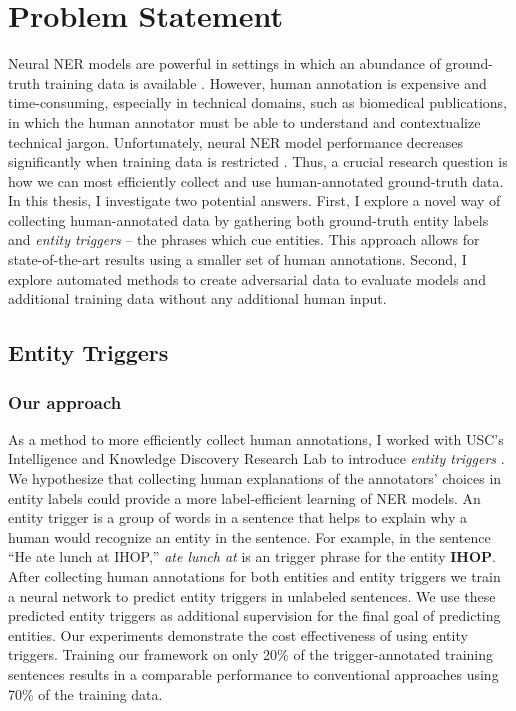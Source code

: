 \section{Problem Statement}
Neural NER models are powerful in settings in which an abundance of ground-truth training data is available \citep{LampleNER}. However, human annotation is expensive and time-consuming, especially in technical domains, such as biomedical publications, in which the human annotator must be able to understand and contextualize technical jargon. Unfortunately, neural NER model performance decreases significantly when training data is restricted \citep{TriggerNER}. Thus, a crucial research question is how we can most efficiently collect and use human-annotated ground-truth data. In this thesis, I investigate two potential answers. First, I explore a novel way of collecting human-annotated data by gathering both ground-truth entity labels and \textit{entity triggers} -- the phrases which cue entities. This approach allows for state-of-the-art results using a smaller set of human annotations. Second, I explore automated methods to create adversarial data to evaluate models and additional training data without any additional human input.

\subsection{Entity Triggers}
\subsubsection{Our approach}
As a method to more efficiently collect human annotations, I worked with USC's Intelligence and Knowledge Discovery Research Lab to introduce \textit{entity triggers} \citep{TriggerNER}. We hypothesize that collecting human explanations of the annotators' choices in entity labels could provide a more label-efficient learning of NER models. An entity trigger is a group of words in a sentence that helps to explain why a human would recognize an entity in the sentence. For example, in the sentence ``He ate lunch at IHOP,'' \textit{ate lunch at} is an trigger phrase for the entity \textbf{IHOP}. After collecting human annotations for both entities and entity triggers we train a neural network to predict entity triggers in unlabeled sentences. We use these predicted entity triggers as additional supervision for the final goal of predicting entities. Our experiments demonstrate the cost effectiveness of using entity triggers. Training our framework on only 20\% of the trigger-annotated training sentences results in a comparable performance to conventional approaches using 70\% of the training data.


